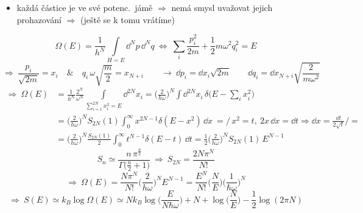{\color{NavyBlue}
\begin{itemize}
  \item každá částice je  ve své potenc.\ jámě $\Rightarrow$ nemá smysl uvažovat jejich prohazování $\Rightarrow$
         (ještě se k tomu vrátíme)
\end{itemize}
\[
  \Omega(E) = \frac{1}{h^N}\int\limits_{H = E}\dd^Np\,\dd^Nq \ \Leftrightarrow\ \sum_i\frac{p_i^2}{2m} + \frac12m\omega^2q_i^2 = E
\]
\[
  \Rightarrow\ \frac{p_i}{\sqrt{2m}} = x_i \quad\&\quad q_i\,\omega\sqrt{\frac m2} = x_{N+i}
  \qquad\to\ \dd p_i = \dd x_i\sqrt{2m} \qquad \dd q_i = \dd x_{N+i}\sqrt{\frac{2}{m\omega^2}}
\]
\begin{align*}
  \Rightarrow\ \Omega(E) &= \frac{1}{h^N}\frac{2^N}{\omega^N}\int\limits_{\sum_{i=1}^{2N}x_i^2 = E}\dd^{2N}x_i
   = \Big(\frac{2}{h\omega}\Big)^N\int\dd^{2N}x_i\,\delta\Big(E - \sum_ix_i^2\Big) \\
  &= \Big(\frac{2}{h\omega}\Big)^N S_{2N}(1)\int_0^\infty x^{2N-1}\delta(E - x^2)\,\dd x
     \ = \Big/\,{\textstyle x^2 = t,\ 2x\,\dd x = \dd t \Rightarrow \dd x = \frac{\dd t}{2\sqrt t}}\Big/ = \\
  &= \Big(\frac{2}{h\omega}\Big)^N\frac{S_{2N}(1)}{2}\int_0^\infty t^{N-1}\delta(E - t)\,\dd t
   = \frac12\Big(\frac{2}{h\omega}\Big)^N S_{2N}(1)\,E^{N-1}
\end{align*}
\[
  S_n \simeq \frac{n\,\pi^{\frac n2}}{\Gamma\big(\frac n2 + 1\big)} \ \Rightarrow\ S_{2N} = \frac{2N\pi^N}{N!}
\]
\[
  \Rightarrow\ \Omega(E) = \frac{N\pi^N}{N!}\Big(\frac{2}{h\omega}\Big)^N E^{N-1} = \frac{E^N}{N!}\Big(\frac NE\Big)\Big(\frac{1}{\hbar\omega}\Big)^N
\]
\[
  \Rightarrow\ S(E) \simeq k_B\log\Omega(E) \simeq Nk_B\log\Big(\frac{E}{N\hbar\omega}\Big) + N + \log\Big(\frac NE\Big) - \frac12\log(2\pi N)
\]}


